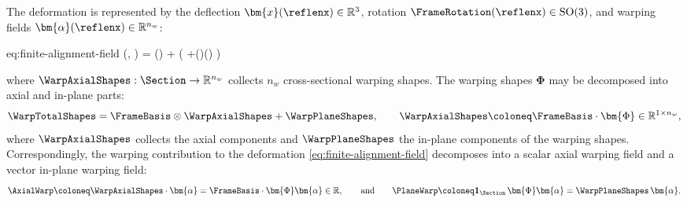The deformation is represented by the deflection \(\bm{x}(\reflenx)\in\mathbb{R}^3\), rotation \(\FrameRotation(\reflenx)\in\mathrm{SO}(3)\), and warping fields \(\bm{\alpha}(\reflenx)\in\mathbb{R}^{n_w}\):
\begin{SaveEquation}{eq:finite-alignment-field}
(, \PlanePosition) 
= () + \FrameRotation \bigl(\PlanePosition 
+\FrameBasis\otimes\WarpAxialShapes()\bm{\alpha}()
\bigr)
\end{SaveEquation}
where \(\WarpAxialShapes:\Section\rightarrow\mathbb{R}^{n_w}\) collects \(n_w\) cross-sectional warping shapes. 
%
\iffalse
The warping shapes \(\bm{\Phi}\) may be decomposed into axial and in-plane parts:
\begin{equation}
\WarpTotalShapes = \FrameBasis\otimes\WarpAxialShapes + \WarpPlaneShapes,
\qquad
\WarpAxialShapes\coloneq \FrameBasis\cdot\bm{\Phi}\in\mathbb{R}^{1\times n_w},
\label{eq:decom-warp-shapes}
\end{equation}
where \(\WarpAxialShapes\) collects the axial components and \(\WarpPlaneShapes\) the in-plane components of the warping shapes. 
Correspondingly, the warping contribution to the deformation \eqref{eq:finite-alignment-field} decomposes into a scalar axial warping field and a vector in-plane warping field:
\begin{equation*}
\AxialWarp\coloneq \WarpAxialShapes\cdot\bm{\alpha} = \FrameBasis\cdot\bm{\Phi}\bm{\alpha}\in\mathbb{R}, 
\qquad\text{and}\qquad
\PlaneWarp\coloneq \mathbf{1}_{\Section}\,\bm{\Phi}\bm{\alpha} = \WarpPlaneShapes\,\bm{\alpha}.
\end{equation*}

